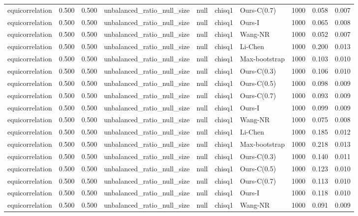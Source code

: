 \begin{tabular}{lrrllllrrr}
equicorrelation & 0.500 & 0.500 & unbalanced\_ratio\_null\_size & null & chisq1 & Ours-C(0.7) & 1000 & 0.058 & 0.007 \\
equicorrelation & 0.500 & 0.500 & unbalanced\_ratio\_null\_size & null & chisq1 & Ours-I & 1000 & 0.065 & 0.008 \\
equicorrelation & 0.500 & 0.500 & unbalanced\_ratio\_null\_size & null & chisq1 & Wang-NR & 1000 & 0.052 & 0.007 \\
equicorrelation & 0.500 & 0.500 & unbalanced\_ratio\_null\_size & null & chisq1 & Li-Chen & 1000 & 0.200 & 0.013 \\
equicorrelation & 0.500 & 0.500 & unbalanced\_ratio\_null\_size & null & chisq1 & Max-bootstrap & 1000 & 0.103 & 0.010 \\
equicorrelation & 0.500 & 0.500 & unbalanced\_ratio\_null\_size & null & chisq1 & Ours-C(0.3) & 1000 & 0.106 & 0.010 \\
equicorrelation & 0.500 & 0.500 & unbalanced\_ratio\_null\_size & null & chisq1 & Ours-C(0.5) & 1000 & 0.098 & 0.009 \\
equicorrelation & 0.500 & 0.500 & unbalanced\_ratio\_null\_size & null & chisq1 & Ours-C(0.7) & 1000 & 0.093 & 0.009 \\
equicorrelation & 0.500 & 0.500 & unbalanced\_ratio\_null\_size & null & chisq1 & Ours-I & 1000 & 0.099 & 0.009 \\
equicorrelation & 0.500 & 0.500 & unbalanced\_ratio\_null\_size & null & chisq1 & Wang-NR & 1000 & 0.075 & 0.008 \\
equicorrelation & 0.500 & 0.500 & unbalanced\_ratio\_null\_size & null & chisq1 & Li-Chen & 1000 & 0.185 & 0.012 \\
equicorrelation & 0.500 & 0.500 & unbalanced\_ratio\_null\_size & null & chisq1 & Max-bootstrap & 1000 & 0.218 & 0.013 \\
equicorrelation & 0.500 & 0.500 & unbalanced\_ratio\_null\_size & null & chisq1 & Ours-C(0.3) & 1000 & 0.140 & 0.011 \\
equicorrelation & 0.500 & 0.500 & unbalanced\_ratio\_null\_size & null & chisq1 & Ours-C(0.5) & 1000 & 0.123 & 0.010 \\
equicorrelation & 0.500 & 0.500 & unbalanced\_ratio\_null\_size & null & chisq1 & Ours-C(0.7) & 1000 & 0.113 & 0.010 \\
equicorrelation & 0.500 & 0.500 & unbalanced\_ratio\_null\_size & null & chisq1 & Ours-I & 1000 & 0.118 & 0.010 \\
equicorrelation & 0.500 & 0.500 & unbalanced\_ratio\_null\_size & null & chisq1 & Wang-NR & 1000 & 0.091 & 0.009 \\

\end{tabular}
